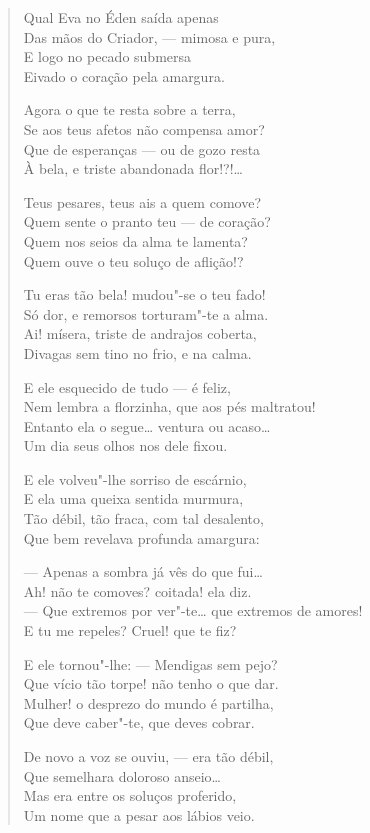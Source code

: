 \begin{verse}
Qual Eva no Éden saída apenas\\
Das mãos do Criador, --- mimosa e pura,\\
E logo no pecado submersa\\
Eivado o coração pela amargura.

Agora o que te resta sobre a terra,\\
Se aos teus afetos não compensa amor?\\
Que de esperanças --- ou de gozo resta\\
À bela, e triste abandonada flor!?!\ldots{}

Teus pesares, teus ais a quem comove?\\
Quem sente o pranto teu --- de coração?\\
Quem nos seios da alma te lamenta?\\
Quem ouve o teu soluço de aflição!?

Tu eras tão bela! mudou"-se o teu fado!\\
Só dor, e remorsos torturam"-te a alma.\\
Ai! mísera, triste de andrajos coberta,\\
Divagas sem tino no frio, e na calma.

E ele esquecido de tudo --- é feliz,\\
Nem lembra a florzinha, que aos pés maltratou!\\
Entanto ela o segue\ldots{} ventura ou acaso\ldots{}\\
Um dia seus olhos nos dele fixou.

E ele volveu"-lhe sorriso de escárnio,\\
E ela uma queixa sentida murmura,\\
Tão débil, tão fraca, com tal desalento,\\
Que bem revelava profunda amargura:

--- Apenas a sombra já vês do que fui\ldots{}\\
Ah! não te comoves? coitada! ela diz.\\
--- Que extremos por ver"-te\ldots{} que extremos de amores!\\
E tu me repeles? Cruel! que te fiz?

E ele tornou"-lhe: --- Mendigas sem pejo?\\
Que vício tão torpe! não tenho o que dar.\\
Mulher! o desprezo do mundo é partilha,\\
Que deve caber"-te, que deves cobrar.

De novo a voz se ouviu, --- era tão débil,\\
Que semelhara doloroso anseio\ldots{}\\
Mas era entre os soluços proferido,\\
Um nome que a pesar aos lábios veio.


\end{verse}
